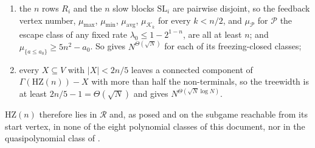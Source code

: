 \begin{proposition}
\begin{enumerate}[label=\textup{(\roman*)},leftmargin=2.4em]
\item the $n$ rows $R_i$ and the $n$ slow blocks $\mathrm{SL}_i$ are pairwise
      disjoint, so the feedback vertex number, $\mu_{\max}$, $\mu_{\min}$,
      $\mu_{\mathrm{avg}}$, $\mu_{\mathcal K_k}$ for every $k<n/2$, and
      $\mu_{\mathcal P}$ for $\mathcal P$ the escape class of any fixed rate
      $\lambda_0\le1-2^{1-n}$, are all at least $n$; and
      $\mu_{\{a\le a_0\}}\ge5n^{2}-a_0$. So  gives
      $N^{\Theta(\sqrt N)}$ for each of its freezing-closed classes;
\item every $X\subseteq V$ with $|X|<2n/5$ leaves a connected component of
      $\Gamma(\mathrm{HZ}(n))-X$ with more than half the non-terminals, so the
      treewidth is at least $2n/5-1=\Theta(\sqrt N)$ and  gives
      $N^{\Theta(\sqrt N\log N)}$.
\end{enumerate}
$\mathrm{HZ}(n)$ therefore lies in $\mathcal R$ and, as posed and on the
subgame reachable from its start vertex, in none of the eight polynomial
classes of this document, nor in the quasipolynomial class of .
\end{proposition}

